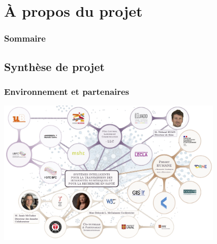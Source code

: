 \documentclass[xcolor=dvipsnames]{beamer}
\begin{document}
\section{À propos du projet}

\begin{frame}
\frametitle{Sommaire}
\tableofcontents[currentsection]
\end{frame}

\subsection{Synthèse de projet}
\begin{frame}[fragile]
\frametitle{Environnement et partenaires}
\includegraphics[height = 7cm]{images/mindmap.png}
\end{frame}
\end{document}
